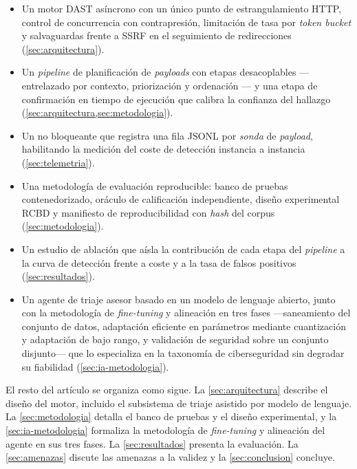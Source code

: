 \begin{itemize}
  \item Un motor DAST asíncrono con un único punto de estrangulamiento HTTP,
  control de concurrencia con contrapresión, limitación de tasa por
  \emph{token bucket} y salvaguardas frente a SSRF en el seguimiento de
  redirecciones (\cref{sec:arquitectura}).
  \item Un \emph{pipeline} de planificación de \emph{payloads} con etapas
  desacoplables --- entrelazado por contexto, priorización y ordenación --- y
  una etapa de confirmación en tiempo de ejecución que calibra la confianza
  del hallazgo (\cref{sec:arquitectura,sec:metodologia}).
  \item Un  no bloqueante que registra una fila JSONL
  por \emph{sonda} de \emph{payload}, habilitando la medición del coste de
  detección instancia a instancia (\cref{sec:telemetria}).
  \item Una metodología de evaluación reproducible: banco de pruebas
  contenedorizado, oráculo de calificación independiente, diseño experimental
  RCBD y manifiesto de reproducibilidad con \emph{hash} del corpus
  (\cref{sec:metodologia}).
  \item Un estudio de ablación que aísla la contribución de cada etapa del
  \emph{pipeline} a la curva de detección frente a coste y a la tasa de
  falsos positivos (\cref{sec:resultados}).
  \item Un agente de triaje asesor basado en un modelo de lenguaje abierto,
  junto con la metodología de \emph{fine-tuning} y alineación en tres fases
  ---saneamiento del conjunto de datos, adaptación eficiente en parámetros
  mediante cuantización y adaptación de bajo rango, y validación de seguridad
  sobre un conjunto disjunto--- que lo especializa en la taxonomía de
  ciberseguridad sin degradar su fiabilidad
  (\cref{sec:ia-metodologia}).
\end{itemize}

El resto del artículo se organiza como sigue. La \cref{sec:arquitectura}
describe el diseño del motor, incluido el subsistema de triaje asistido por
modelo de lenguaje. La \cref{sec:metodologia} detalla el banco de pruebas y el
diseño experimental, y la \cref{sec:ia-metodologia} formaliza la metodología de
\emph{fine-tuning} y alineación del agente en sus tres fases. La
\cref{sec:resultados} presenta la evaluación. La \cref{sec:amenazas} discute
las amenazas a la validez y la \cref{sec:conclusion} concluye.
